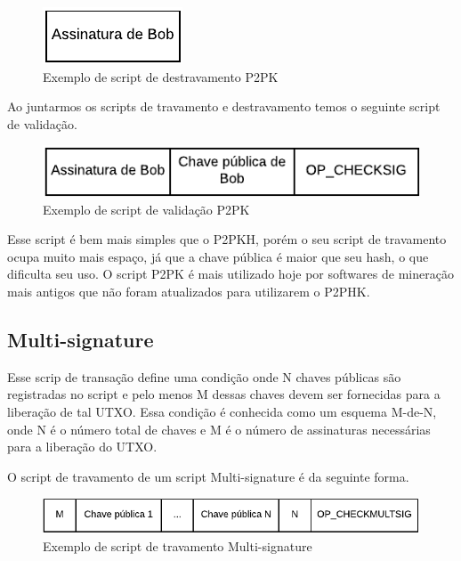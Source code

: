 \documentclass[conference,compsoc]{IEEEtran}
\begin{document}
\begin{figure}[H]
    \centering
    \includegraphics[keepaspectratio=true, scale=0.8]{img/P2PK_script_destravamento.pdf}
    \caption{Exemplo de script de destravamento P2PK}
    \label{fig:P2PK_Destravamento}
\end{figure}

Ao juntarmos os scripts de travamento e destravamento temos o seguinte script de validação.

\begin{figure}[H]
    \centering
    \includegraphics[keepaspectratio=true, scale=0.8]{img/P2PK_script_validacao.pdf}
    \caption{Exemplo de script de validação P2PK}
    \label{fig:P2PK_Validacao}
\end{figure}

Esse script é bem mais simples que o P2PKH, porém o seu script de travamento ocupa muito mais espaço, já que a chave pública é maior que seu hash, o que dificulta seu uso. O script P2PK é mais utilizado hoje por softwares de mineração mais antigos que não foram atualizados para utilizarem o P2PHK.

\subsection*{Multi-signature}
\label{sec:Multi-signature}
Esse scrip de transação define uma condição onde N chaves públicas são registradas no script e pelo menos M dessas chaves devem ser fornecidas para a liberação de tal UTXO. Essa condição é conhecida como um esquema M-de-N, onde N é o número total de chaves e M é o número de assinaturas necessárias para a liberação do UTXO.

O script de travamento de um script Multi-signature é da seguinte forma.

\begin{figure}[H]
    \centering
    \includegraphics[keepaspectratio=true, scale=0.75]{img/Multsig_script_travamento.pdf}
    \caption{Exemplo de script de travamento Multi-signature}
    \label{fig:Multi-signature_Travamento}
\end{figure}
\end{document}
